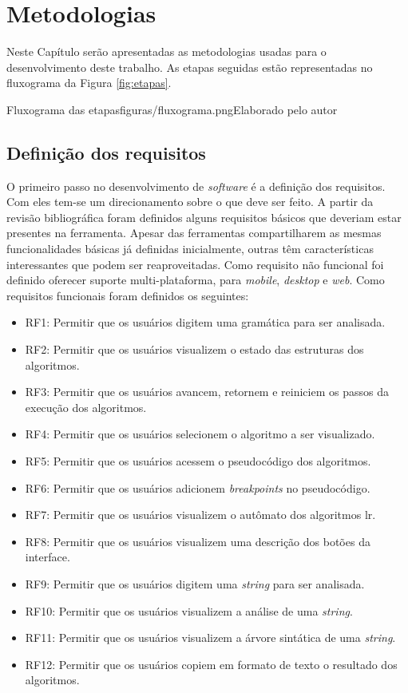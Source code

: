 \chapter{Metodologias}
\label{chap:metodologia}
Neste Capítulo serão apresentadas as metodologias usadas para o desenvolvimento deste trabalho. As etapas seguidas estão representadas no fluxograma da Figura \ref{fig:etapas}.

\begin{mypicture}{\label{fig:etapas}}{Fluxograma das etapas}{figuras/fluxograma.png}{Elaborado pelo autor}
\end{mypicture}

\section{Definição dos requisitos\label{sec:requisitos}}
O primeiro passo no desenvolvimento de \textit{software} é a definição dos requisitos. Com eles tem-se um direcionamento sobre o que deve ser feito. A partir da revisão bibliográfica foram definidos alguns requisitos básicos que deveriam estar presentes na ferramenta. Apesar das ferramentas compartilharem as mesmas funcionalidades básicas já definidas inicialmente, outras têm características interessantes que podem ser reaproveitadas. Como requisito não funcional foi definido oferecer suporte multi-plataforma, para \textit{mobile}, \textit{desktop} e \textit{web}. Como requisitos funcionais foram definidos os seguintes:

\begin{itemize}[label={$\sbullet$}]
	\item RF1: Permitir que os usuários digitem uma gramática para ser analisada.
	\item RF2: Permitir que os usuários visualizem o estado das estruturas dos algoritmos.
	\item RF3: Permitir que os usuários avancem, retornem e reiniciem os passos da execução dos algoritmos.
	\item RF4: Permitir que os usuários selecionem o algoritmo a ser visualizado.
	\item RF5: Permitir que os usuários acessem o pseudocódigo dos algoritmos.
	\item RF6: Permitir que os usuários adicionem \textit{breakpoints} no pseudocódigo.
	\item RF7: Permitir que os usuários visualizem o autômato dos algoritmos \gls{lr}.
	\item RF8: Permitir que os usuários visualizem uma descrição dos botões da interface.
	\item RF9: Permitir que os usuários digitem uma \textit{string} para ser analisada.
	\item RF10: Permitir que os usuários visualizem a análise de uma \textit{string}.
	\item RF11: Permitir que os usuários visualizem a árvore sintática de uma \textit{string}.
	\item RF12: Permitir que os usuários copiem em formato de texto o resultado dos algoritmos.
\end{itemize}

